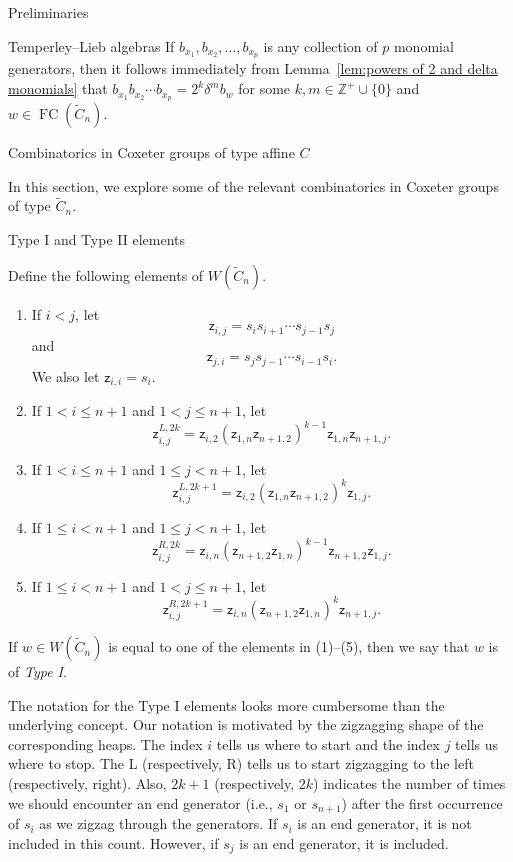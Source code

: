 \documentclass[11pt]{amsart}
\theoremstyle{definition}
\numberwithin{equation}{section}
\newcommand{\Z}{\mathbb{Z}}
\newcommand{\C}{\widetilde{C}}
\newcommand{\z}{\mathsf{z}}
\renewcommand{\(}{\left(}
\renewcommand{\)}{\right)}
\DeclareMathOperator{\FC}{FC}
\begin{document}
\begin{section}{Preliminaries}
\begin{subsection}{Temperley--Lieb algebras}
If $b_{x_{1}}, b_{x_{2}}, \dots, b_{x_{p}}$ is any collection of $p$ monomial generators, then it follows immediately from Lemma~\ref{lem:powers of 2 and delta monomials}  that $b_{x_{1}}b_{x_{2}}\cdots b_{x_{p}}=2^{k}\delta^{m} b_{w}$ for some $k, m \in \Z^{+}\cup \{0\}$ and $w \in \FC(\C_{n})$.

\end{subsection}

\end{section}


\begin{section}{Combinatorics in Coxeter groups of type affine $C$}\label{sec:combinatorics}

In this section, we explore some of the relevant combinatorics in Coxeter groups of type $\C_n$.


\begin{subsection}{Type I and Type II elements}

Define the following elements of $W(\C_{n})$.
\begin{enumerate}
\item If $i<j$, let
\[
\z_{i,j}=s_{i}s_{i+1}\cdots s_{j-1}s_{j}
\]
and
\[
\z_{j,i}=s_{j}s_{j-1}\cdots s_{i-1}s_{i}.
\]
We also let $\z_{i,i}=s_{i}$.

\item If $1< i \leq n+1$ and $1 < j \leq n+1$, let
\[
\z^{L,2k}_{i,j}=\z_{i,2}(\z_{1,n}\z_{n+1,2})^{k-1}\z_{1,n}\z_{n+1,j}.
\]
\item If $1< i \leq n+1$ and $1 \leq j < n+1$, let
\[
\z^{L,2k+1}_{i,j}=\z_{i,2}(\z_{1,n}\z_{n+1,2})^{k}\z_{1,j}.
\]

\item If $1\leq i < n+1$ and $1 \leq j <  n+1$, let
\[
\z^{R,2k}_{i,j}=\z_{i,n}(\z_{n+1,2}\z_{1,n})^{k-1}\z_{n+1,2}\z_{1,j}.
\]
	
\item If $1\leq i < n+1$ and $1 < j \leq  n+1$, let 
\[
\z^{R,2k+1}_{i,j}=\z_{i,n}(\z_{n+1,2}\z_{1,n})^{k}\z_{n+1,j}.
\]
\end{enumerate}
If $w \in W(\C_n)$ is equal to one of the elements in (1)--(5), then we say that $w$ is of \emph{Type I}.

The notation for the Type I elements looks more cumbersome than the underlying concept.  Our notation is motivated by the zigzagging shape of the corresponding heaps.  The index $i$ tells us where to start and the index $j$ tells us where to stop.  The L (respectively, R) tells us to start zigzagging to the left (respectively, right).  Also, $2k+1$ (respectively, $2k$) indicates the number of times we should encounter an end generator (i.e., $s_{1}$ or $s_{n+1}$) after the first occurrence of $s_{i}$ as we zigzag through the generators.  If $s_{i}$ is an end generator, it is not included in this count.  However, if $s_{j}$ is an end generator, it is included.  


\end{subsection}
\end{section}
\end{document}
